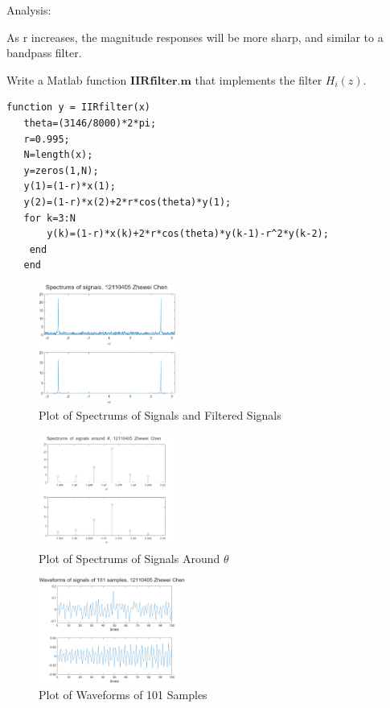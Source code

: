 \documentclass[journal]{IEEEtran}
\begin{document}
\textcolor[rgb]{0,0.6,1}{Analysis:}

As r increases, the magnitude responses will be more sharp, and similar to a bandpass filter.

Write a Matlab function \(\mathbf{ IIRfilter.m }\) that implements the filter \(H_i(z)\).

\begin{lstlisting}[title={IIRfilter.m},style=Matlab-editor]
   function y = IIRfilter(x)
   theta=(3146/8000)*2*pi;
   r=0.995;
   N=length(x);
   y=zeros(1,N);
   y(1)=(1-r)*x(1);
   y(2)=(1-r)*x(2)+2*r*cos(theta)*y(1);
   for k=3:N
       y(k)=(1-r)*x(k)+2*r*cos(theta)*y(k-1)-r^2*y(k-2);
    end
   end    
\end{lstlisting}

\begin{figure}[htbp]
   \centering
   \includegraphics[width=0.4\textwidth]{42.png}
\caption{Plot of Spectrums of Signals and Filtered Signals}
   \end{figure}
   
\begin{figure}[htbp]
   \centering
   \includegraphics[width=0.4\textwidth]{43.png}
\caption{Plot of Spectrums of Signals Around \(\theta\)}
   \end{figure}

   \begin{figure}[htbp]
      \centering
      \includegraphics[width=0.43\textwidth]{44.png}
   \caption{Plot of Waveforms of 101 Samples}
      \end{figure}
\end{document}
